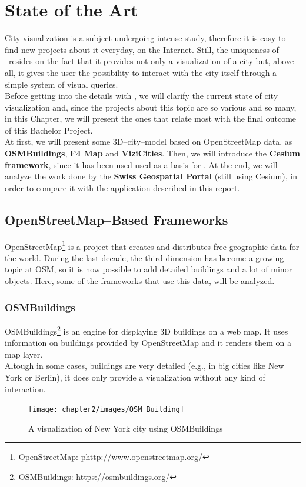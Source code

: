 \section{State of the Art} \label{stateOfTheArt}
City visualization is a subject undergoing intense study, therefore it is easy to find new projects about it everyday, on the Internet. Still, the uniqueness of \applicationName\ resides on the fact that it provides not only a visualization of a city but, above all, it gives the user the possibility to interact with the city itself through a simple system of visual queries.\\

Before getting into the details with \applicationName, we will clarify the current state of city visualization and, since the projects about this topic are so various and so many, in this Chapter, we will present the ones that relate most with the final outcome of this Bachelor Project.\\

At first, we will present some 3D--city--model based on OpenStreetMap data, as {\bf OSMBuildings}, {\bf F4 Map} and {\bf ViziCities}. Then, we will introduce the {\bf Cesium framework}, since it has been used used as a basis for \applicationName. At the end, we will analyze the work done by the {\bf Swiss Geospatial Portal} (still using Cesium), in order to compare it with the application described in this report. 
\subsection{OpenStreetMap--Based Frameworks}
OpenStreetMap\footnote{OpenStreetMap: phttp://www.openstreetmap.org/} is a project that creates and distributes free geographic data for the world. During the last decade, the third dimension has become a growing topic at OSM, so it is now possible to add detailed buildings and a lot of minor objects. Here, some of the frameworks that use this data, will be analyzed.
\subsubsection{OSMBuildings}
OSMBuildings\footnote{OSMBuildings: https://osmbuildings.org/} is an engine for displaying 3D buildings on a web map. It uses information on buildings provided by OpenStreetMap and it renders them on a map layer.\\Altough in some cases, buildings are very detailed (e.g., in big cities like New York or Berlin), it does only provide a visualization without any kind of interaction.
\begin{figure} [H]
\centering
\texttt{[image: chapter2/images/OSM\_Building]}
\caption{A visualization of New York city using OSMBuildings}
\label{fig:OSM_Building}
\end{figure}


